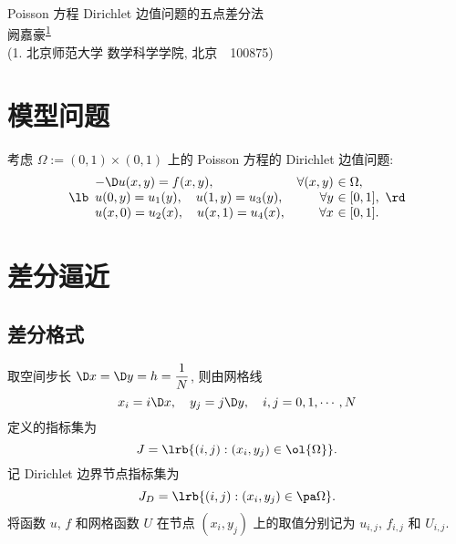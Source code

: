 \documentclass[UTF8, a4paper, 12pt, oneside, onecolumn]{article}
\def\homeworkName{Poisson 方程 Dirichlet 边值问题的五点差分法}
\begin{document}
\thispagestyle{plain}

\begin{center}
	{\heiti \homeworkName} \\
	\vspace{1.5ex}
	{\fangsong 阙嘉豪\textsuperscript{\hyperref[auth:1]{1}}} \\
	{\songti \label{auth:1}(1. 北京师范大学 数学科学学院, 北京~~100875)}
\end{center}



\section{模型问题}

考虑 $\Omega := (0, 1) \times (0, 1)$ 上的 Poisson 方程的 Dirichlet 边值问题:
\begin{equation}\label{equ:DirichletProblem}
	\lb\begin{array}{lr@{~}l}
		-\D u(x, y) = f(x, y),	&	\forall (x, y) &\in \Omega, \\
		u(0, y) = u_1(y),\quad u(1, y) = u_3(y),	&	\forall y &\in [0, 1], \\
		u(x, 0) = u_2(x),\quad u(x, 1) = u_4(x),	&	\forall x &\in [0, 1].
	\end{array}\rd
\end{equation}

\section{差分逼近}

\subsection{差分格式}

取空间步长 $\D x = \D y = h = \dfrac{1}{N}$, 则由网格线
$$x_i = i\D x,\quad y_j = j\D y,\quad i, j = 0, 1, \cdots, N$$
定义的指标集为 
$$J = \lrb{(i, j) : (x_i, y_j) \in \ol{\Omega}}.$$
记 Dirichlet 边界节点指标集为
$$J_D = \lrb{(i, j) : (x_i, y_j) \in \pa \Omega}.$$
将函数 $u$, $f$ 和网格函数 $U$ 在节点 $(x_i, y_j)$ 上的取值分别记为 $u_{i,j}$, $f_{i,j}$ 和 $U_{i,j}$.
\end{document}
